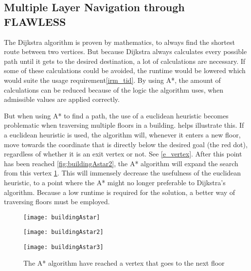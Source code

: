 \subsection{Multiple Layer Navigation through FLAWLESS} \label{multlayhan}

The Dijkstra algorithm is proven by mathematics, to always find the shortest route between two vertices. But because Dijkstra always calculates every possible path until it gets to the desired destination, a lot of calculations are necessary. If some of these calculations could be avoided, the runtime would be lowered which would suite the usage requirement\cref{irm_tid}. By using A*, the amount of calculations can be reduced because of the logic the algorithm uses, when admissible values are applied correctly.

But when using A* to find a path, the use of a euclidean heuristic becomes problematic when traversing multiple floors in a building.  helps illustrate this. If a euclidean heuristic is used, the algorithm will, whenever it enters a new floor, move towards the coordinate that is directly below the desired goal (the red dot), regardless of whether it is an exit vertex or not. See \cref{e_vertex}. After this point has been reached \cref{fig:buildingAstar2}, the A* algorithm will expand the search from this vertex \cref{fig:buildingAstar3}. This will immensely decrease the usefulness of the euclidean heuristic, to a point where the A* might no longer preferable to Dijkstra's algorithm. Because a low runtime is required for the solution, a better way of traversing floors must be employed.


\begin{figure}
\centering
  \begin{minipage}{0.45\textwidth}
    \centering
    \texttt{[image: buildingAstar]}
    \caption{Step 1: How the A* algorithm would expand, if using the euclidean distance as heuristic}
    \label{fig:buildingAstar1}
  \end{minipage}
  \hfill
  \begin{minipage}{0.45\textwidth}
    \centering
    \texttt{[image: buildingAstar2]}
    \caption{The A* algorithm will expand the search from this vertex\newline}
    \label{fig:buildingAstar2}
  \end{minipage}
  \hfill
  \begin{minipage}{0.45\textwidth}
    \raggedright
    \texttt{[image: buildingAstar3]}
    \caption{The A* algorithm have reached a vertex that goes to the next floor}
    \label{fig:buildingAstar3}
  \end{minipage}
\end{figure}


